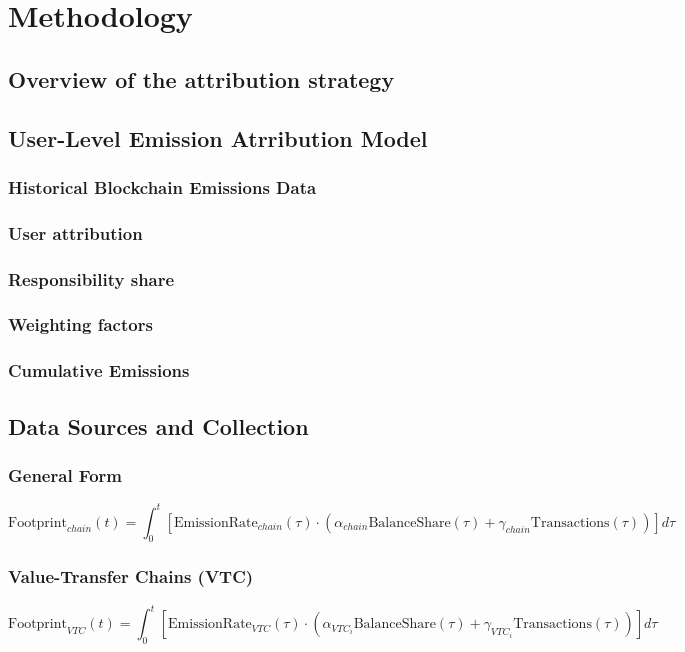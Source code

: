 \documentclass[12pt]{article}
\begin{document}
\section{Methodology}
\subsection{Overview of the attribution strategy}
\subsection{User-Level Emission Atrribution Model}
\subsubsection{Historical Blockchain Emissions Data}
\subsubsection{User attribution}
\subsubsection{Responsibility share}
\subsubsection{Weighting factors}
\subsubsection{Cumulative Emissions}
\subsection{Data Sources and Collection}


\subsubsection*{General Form}
\begin{equation}
\text{Footprint}_{chain}(t) = \int_{0}^{t} \left[ \text{EmissionRate}_{chain}(\tau) \cdot \left( \alpha_{chain} \text{BalanceShare}(\tau) + \gamma_{chain} \text{Transactions}(\tau) \right) \right] d\tau
\end{equation}




\subsubsection*{Value-Transfer Chains (VTC)}
\begin{equation}
\text{Footprint}_{VTC}(t) = \int_{0}^{t} \left[ \text{EmissionRate}_{VTC}(\tau) \cdot \left( \alpha_{VTC_i} \text{BalanceShare}(\tau) + \gamma_{VTC_i} \text{Transactions}(\tau) \right) \right] d\tau
\end{equation}
\end{document}
